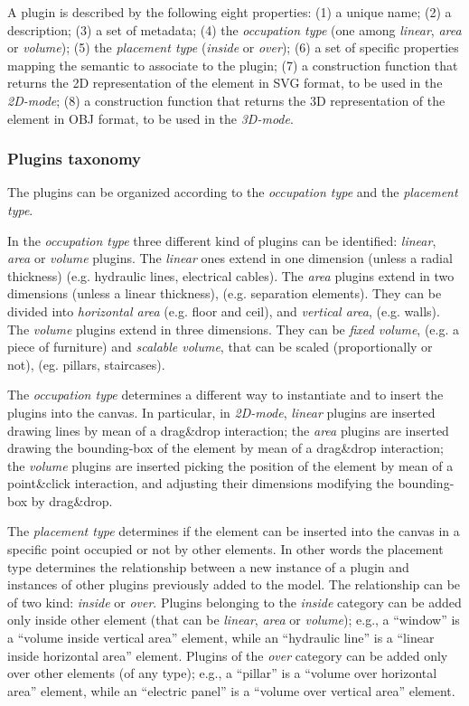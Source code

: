 A plugin is described by the following eight properties: (1) a unique name; (2) a description; (3) a set of metadata; (4) the \emph{occupation type} (one among \emph{linear}, \emph{area} or \emph{volume}); (5) the \emph{placement type} (\emph{inside} or \emph{over}); (6) a set of specific properties mapping the semantic to associate to the plugin; (7) a construction function that returns the 2D representation of the element in SVG format, to be used in the \emph{2D-mode}; (8) a construction function that returns the 3D representation of the element in OBJ format, to be used in the \emph{3D-mode}.

\subsubsection{Plugins taxonomy}\label{ssec:taxonomy}

\noindent The plugins can be organized according to the \emph{occupation type} and the \emph{placement type}. 

In the \emph{occupation type} three different kind of plugins can be identified: \emph{linear}, \emph{area} or \emph{volume} plugins.
The \emph{linear} ones extend in one dimension (unless a radial thickness) (e.g. hydraulic lines, electrical cables). The \emph{area} plugins extend in two dimensions (unless a linear thickness), (e.g. separation elements). They can be divided into \emph{horizontal area} (e.g. floor and ceil), and \emph{vertical area}, (e.g. walls). The \emph{volume} plugins extend in three dimensions. They can be \emph{fixed volume}, (e.g. a piece of furniture) and \emph{scalable volume}, that can be scaled (proportionally or not), (eg. pillars, staircases).

The \emph{occupation type} determines a different way to instantiate and to insert the plugins into the canvas.
In particular, in \emph{2D-mode}, \emph{linear} plugins are inserted drawing lines by mean of a drag\&drop interaction;
the \emph{area} plugins are inserted drawing the bounding-box of the element by mean of a drag\&drop interaction;
the \emph{volume} plugins are inserted picking the position of the element by mean of a point\&click interaction,
and adjusting their dimensions modifying the bounding-box by drag\&drop.

The \emph{placement type} determines if the element can be inserted into the canvas in a specific point occupied or not by other elements. In other words 
the {placement type} determines the relationship between a new instance of a plugin and instances of other plugins previously added to the model. The relationship can be of two kind: \emph{inside} or \emph{over}.
Plugins belonging to the \emph{inside} category can be added only inside other element (that can be \emph{linear}, \emph{area} or \emph{volume}); e.g., a ``window'' is a ``volume inside vertical area'' element,
while an ``hydraulic line'' is a ``linear inside horizontal area'' element.
Plugins of the \emph{over} category can be added only over other elements (of any type);
e.g., a ``pillar'' is a ``volume over horizontal area'' element,
while an ``electric panel'' is a ``volume over vertical area'' element.

